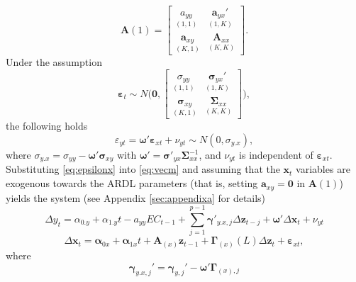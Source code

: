 \begin{equation}
   \mathbf{A}(1)=\begin{bmatrix}
\underset{(1,1)}{a_{yy}} & \underset{(1,K)}{\mathbf{a}_{yx}'} \\ \underset{(K,1)}{\mathbf{a}_{xy}} & \underset{(K,K)}{\mathbf{A}_{xx}}  
\end{bmatrix}.
\end{equation}
Under the assumption 
\begin{equation}\label{eq:normerr}
\boldsymbol{\varepsilon}_t \sim N\Bigg(\mathbf{0}, \begin{bmatrix}
\underset{(1,1)}{\sigma_{yy}}& \underset{(1,K)}{\boldsymbol{\sigma}_{yx}'}   \\ \underset{(K,1)}{\boldsymbol{\sigma}_{xy}} & \underset{(K,K)}{\boldsymbol{\Sigma}_{xx}} \end{bmatrix}\Bigg), 
\end{equation}
the following holds
\begin{equation}\label{eq:epsilonx}
\varepsilon_{yt}=\boldsymbol{\omega}'\boldsymbol{\varepsilon}_{xt}+\nu_{yt} \sim N(0,\sigma_{y.x}),      
\end{equation}
where $\sigma_{y.x}=\sigma_{yy}-\boldsymbol{\omega}'\boldsymbol{\sigma}_{xy}$ with $\boldsymbol{\omega}'=\boldsymbol{\sigma}'_{yx}\boldsymbol{\Sigma}^{-1}_{xx}$, and $\nu_{yt}$ is independent of $\boldsymbol{\varepsilon}_{xt}$.\\
Substituting \eqref{eq:epsilonx} into \eqref{eq:vecm} and assuming that the $\mathbf{x}_{t}$ variables are exogenous towards the ARDL parameters (that is, setting $\mathbf{a}_{xy}=\mathbf{0}$ in $\mathbf{A}(1)$) yields the system (see Appendix \ref{sec:appendixa} for details)
\begin{equation}\label{eq:ardl}
 	\Delta y_{t}=\alpha_{0.y}+\alpha_{1.y}t -a_{yy}EC_{t-1}+ \sum_{j=1}^{p-1}\boldsymbol{\gamma}'_{y.x,j}\Delta\mathbf{z}_{t-j}+\boldsymbol{\omega}'\Delta\mathbf{x}_{t}+\nu_{yt}
\end{equation}
\begin{equation}\label{eq:marg}
\Delta\mathbf{x}_{t} 
= \boldsymbol{\alpha}_{0x} +\boldsymbol{\alpha}_{1x}t+ \mathbf{A}_{(x)}\mathbf{z}_{t-1}+ \boldsymbol{\Gamma}_{(x)}(L)\Delta\mathbf{z}_t+ \boldsymbol{\varepsilon}_{xt},
\end{equation}
where 
\begin{equation}\label{eq:ardlgamma}
\boldsymbol\gamma_{y.x,j}'=\boldsymbol\gamma_{y,j}'-\boldsymbol{\omega}'\boldsymbol{\Gamma}_{(x),j}
\end{equation}
